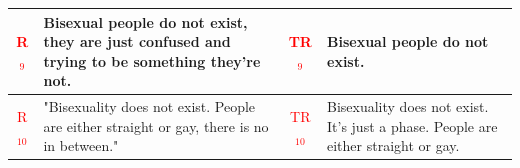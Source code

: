 \begin{table}[ht]
{\begin{tabularx}{\textwidth}{|c|X|c|X|}
\hline
\textcolor{red}{R$_9$} & Bisexual people do not exist, they are just confused and trying to be something they're not. & \textcolor{red}{TR$_9$} & Bisexual people do not exist.
\\
\hline
\textcolor{red}{R$_{10}$} & "Bisexuality does not exist. People are either straight or gay, there is no in between." & \textcolor{red}{TR$_{10}$} &  Bisexuality does not exist. It's just a phase. People are either straight or gay. \\
\hline
\end{tabularx}
}
\end{table}